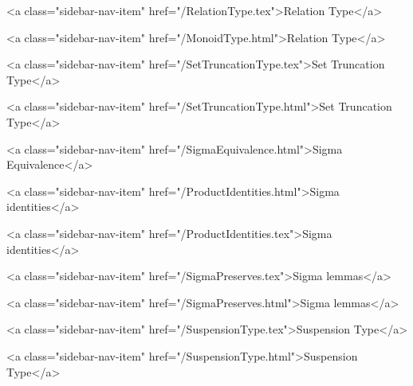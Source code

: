       
    
      
        
          <a class="sidebar-nav-item" href="/RelationType.tex">Relation Type</a>
        
      
    
      
        
          <a class="sidebar-nav-item" href="/MonoidType.html">Relation Type</a>
        
      
    
      
        
          <a class="sidebar-nav-item" href="/SetTruncationType.tex">Set Truncation Type</a>
        
      
    
      
        
          <a class="sidebar-nav-item" href="/SetTruncationType.html">Set Truncation Type</a>
        
      
    
      
        
          <a class="sidebar-nav-item" href="/SigmaEquivalence.html">Sigma Equivalence</a>
        
      
    
      
        
          <a class="sidebar-nav-item" href="/ProductIdentities.html">Sigma identities</a>
        
      
    
      
        
          <a class="sidebar-nav-item" href="/ProductIdentities.tex">Sigma identities</a>
        
      
    
      
        
          <a class="sidebar-nav-item" href="/SigmaPreserves.tex">Sigma lemmas</a>
        
      
    
      
        
          <a class="sidebar-nav-item" href="/SigmaPreserves.html">Sigma lemmas</a>
        
      
    
      
        
          <a class="sidebar-nav-item" href="/SuspensionType.tex">Suspension Type</a>
        
      
    
      
        
          <a class="sidebar-nav-item" href="/SuspensionType.html">Suspension Type</a>
        
